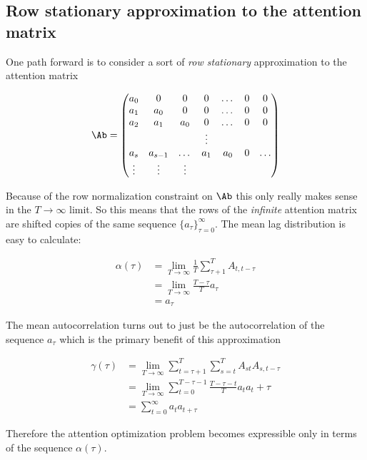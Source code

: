\documentclass{article}
\begin{document}
\subsection{Row stationary approximation to the attention matrix}
One path forward is to consider a sort of \textit{row stationary} approximation to the attention matrix

\begin{equation}\label{astat}
    \Ab = \begin{pmatrix}
        a_0 & 0 & 0 & 0 & \dots  &0 &0\\
        a_1 &a_0 & 0 & 0 & \dots  &0 &0\\
        a_2 &a_1 & a_0 & 0 & \dots  &0 &0\\
        &&&\vdots & \\
        a_s & a_{s-1} & \dots & a_1 & a_0  & 0 & \dots \\
        \vdots & \vdots &\vdots 
    \end{pmatrix}
\end{equation}

 Because of the row normalization constraint on $\Ab$ this only really makes sense in the $T \to \infty$ limit. So this means that the rows of the \textit{infinite} attention matrix are shifted copies of the same sequence $\{a_\tau\}_{\tau=0}^\infty$. The mean lag distribution is easy to calculate:

 \begin{align}
     \alpha(\tau)  &= \lim_{T\to \infty}\frac{1}{T}\sum_{\tau+1}^T A_{t, t-\tau} \\ 
     &= \lim_{T\to \infty}\frac{T - \tau}{T} a_\tau \\
     &= a_\tau
 \end{align}

The mean autocorrelation turns out to just be the autocorrelation of the sequence $a_\tau$ which is the primary benefit of this approximation 

\begin{align}
    \gamma(\tau) &= \lim_{T\to \infty}\sum_{t=\tau+1}^T\sum_{s=t}^T A_{st}A_{s,t-\tau} \\
    &= \lim_{T \to \infty}\sum_{t=0}^{T-\tau-1}\frac{T-\tau-t}{T}a_ta_t+\tau \\
    &= \sum_{t=0}^\infty a_t a_{t+\tau} \label{stat_gamma}
\end{align}

Therefore the attention optimization problem becomes expressible only in terms of the sequence $\alpha(\tau)$. 
\end{document}
